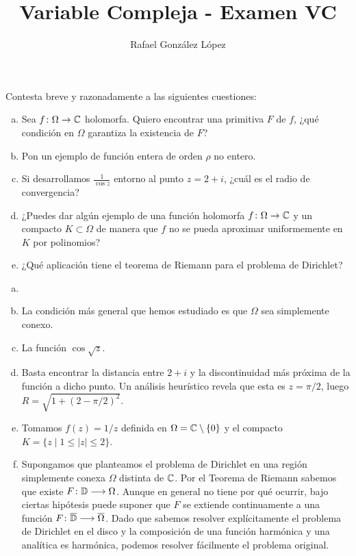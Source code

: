 \documentclass[twoside]{article}
\begin{document}
\title{Variable Compleja - Examen VC}
\author{Rafael González López}
\maketitle


\begin{ejercicio}{1}
Contesta breve y razonadamente a las siguientes cuestiones:
\begin{enumerate}[a)]
\item Sea $f\colon\Omega\to \mathbb{C}$ holomorfa. Quiero encontrar una primitiva $F$ de $f$, ¿qué condición en $\Omega$ garantiza la existencia de $F$?
\item Pon un ejemplo de función entera  de orden $\rho$ no entero. 
\item Si desarrollamos $\frac{1}{\cos z}$ entorno al punto $z=2+i$, ¿cuál es el radio de convergencia?
\item ¿Puedes dar algún ejemplo de una función holomorfa $f\colon\Omega\to\mathbb{C}$ y un compacto 
$K\subset\Omega$ de manera que $f$ no se pueda aproximar uniformemente en $K$ por polinomios?
\item ¿Qué aplicación tiene el teorema de Riemann para el problema de Dirichlet?
\end{enumerate}
\end{ejercicio}
\begin{solucion}
\begin{enumerate}[a)]
\item[]
\item La condición más general que hemos estudiado es que $\Omega$ sea simplemente conexo.
\item La función $\cos \sqrt{z}$.
\item Basta encontrar la distancia entre $2+i$ y la discontinuidad más próxima de la función a dicho punto. Un análisis heurístico revela que esta es $z=\pi/2$, luego $R=\sqrt{1 + (2 - \pi/2)^2}$.
\item Tomamos $f(z)=1/z$ definida en $\Omega = \mathbb{C}\setminus\{0\}$ y el compacto $K=\{z\mid 1\leq |z|\leq 2\}$.
\item Supongamos que planteamos el problema de Dirichlet en una región simplemente conexa $\Omega$ distinta de $\mathbb{C}$. Por el Teorema de Riemann sabemos que existe $F\colon{ \mathbb{D}}\longrightarrow{\Omega}$. Aunque en general no tiene por qué ocurrir, bajo ciertas hipótesis puede suponer que $F$ se extiende continuamente a una función $F\colon{\overline{\mathbb{D}}}\longrightarrow{\overline{\Omega}}$. Dado que sabemos resolver explícitamente el problema de Dirichlet en el disco y la composición de una función harmónica y una analítica es harmónica, podemos resolver fácilmente el problema original.
\end{enumerate}
\end{solucion}
\end{document}
